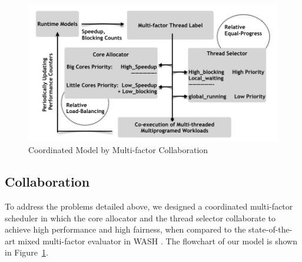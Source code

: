\documentclass{sig-alternate}
\begin{document}

\begin{figure}
\centering
\includegraphics[scale=0.57]{figures/COLAB_M.pdf}
\caption{Coordinated Model by Multi-factor Collaboration}
\label{figure:f2}
\end{figure} 

\subsection{Collaboration}
To address the problems detailed above, we designed a coordinated multi-factor scheduler in which the core allocator and the thread selector collaborate to achieve high performance and high fairness, when compared to the state-of-the-art mixed multi-factor evaluator in WASH \cite{jibaja2016portable}.
The flowchart of our model is shown in Figure~\ref{figure:f2}. 
\end{document}
